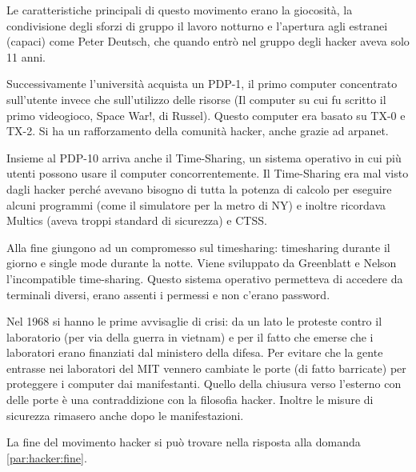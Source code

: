 \documentclass[a4paper]{article}
\begin{document}
		Le caratteristiche principali di questo movimento erano la 
		giocosità, la condivisione degli sforzi di gruppo il lavoro
		notturno e l'apertura agli estranei (capaci) come Peter Deutsch,
		che quando entrò nel gruppo degli hacker aveva solo 11 anni.
		
		Successivamente l'università acquista un PDP-1, il primo
		computer concentrato sull'utente invece che sull'utilizzo
		delle risorse (Il computer su cui fu scritto il primo 
		videogioco, Space War!, di Russel). Questo computer
		era basato su TX-0 e TX-2. Si ha un rafforzamento della 
		comunità hacker, anche grazie ad arpanet.
		
		Insieme al PDP-10 arriva anche il Time-Sharing, un sistema
		operativo in cui più utenti possono usare il computer
		concorrentemente. Il Time-Sharing era mal visto dagli hacker
		perché avevano bisogno di tutta la potenza di calcolo per eseguire
		alcuni programmi (come il simulatore per la metro di NY) e inoltre
		ricordava Multics (aveva troppi standard di sicurezza) e CTSS.
		
		Alla fine giungono ad un compromesso sul timesharing: timesharing
		durante il giorno e single mode durante la notte. Viene sviluppato
		da Greenblatt e Nelson l'incompatible time-sharing. Questo
		sistema operativo permetteva di accedere da terminali diversi, 
		erano assenti i permessi e non c'erano password.
		
		Nel 1968 si hanno le prime avvisaglie di crisi: da un lato
		le proteste contro il laboratorio (per via della guerra in vietnam) e per
		il fatto che emerse che i laboratori erano finanziati dal ministero
		della difesa. Per evitare che la gente entrasse nei laboratori
		del MIT vennero cambiate le porte (di fatto barricate) per proteggere
		i computer dai manifestanti. Quello della chiusura verso l'esterno
		con delle porte è una contraddizione con la filosofia hacker. 
		Inoltre le misure di sicurezza rimasero anche dopo le manifestazioni.
		
		La fine del movimento hacker si può trovare nella risposta
		alla domanda \ref{par:hacker:fine}. 
		
		 
		
\end{document}
